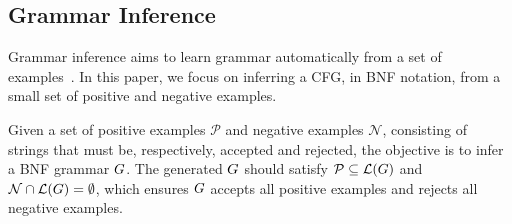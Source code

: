



\subsection{Grammar Inference}
Grammar inference aims to learn grammar automatically from a set of examples~\cite{horning1969study,de2010grammatical,Stevenson_Cordy_2014,D_Ulizia_Ferri_Grifoni_2011}. In this paper, we focus on inferring a CFG, in BNF notation, from a small set of positive and negative examples. 

Given a set of positive examples $\mathcal{P}$ and negative examples $\mathcal{N}$, consisting of strings that must be, respectively, accepted and rejected, the objective is to infer a BNF grammar $G$. The generated $G$ should satisfy $\mathcal{P} \subseteq \mathcal{L}(G)$ and $\mathcal{N} \cap \mathcal{L}(G) = \emptyset$, which ensures $G$ accepts all positive examples and rejects all negative examples.

